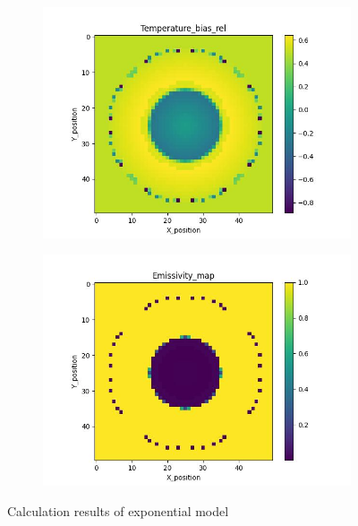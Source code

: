 \begin{figure}[htbp]
\begin{minipage}{\textwidth}
\begin{subfigure}{0.49\textwidth}
        \end{subfigure}
    \end{minipage}\\
    \begin{minipage}{\textwidth}
        \centering
        \begin{subfigure}{0.49\textwidth}
            \centering
            \includegraphics[width=\textwidth]{figures/raw_data/31/exp/T_bias.jpg}
        \end{subfigure}
        \begin{subfigure}{0.49\textwidth}
            \centering
            \includegraphics[width=\textwidth]{figures/raw_data/31/exp/emi_cal.jpg}
        \end{subfigure}
    \end{minipage}
    \caption{Calculation results of exponential model}
    \label{fig: result_exponential_model}
\end{figure}

